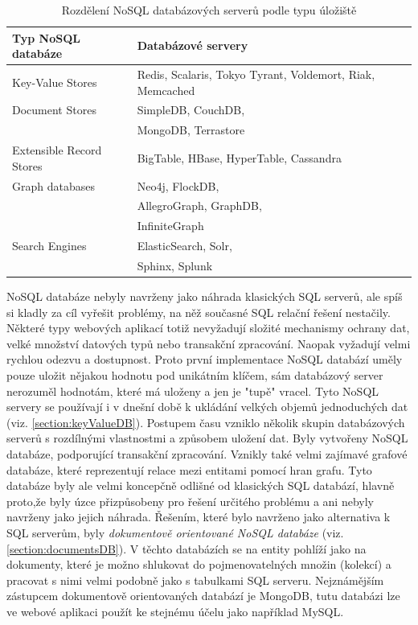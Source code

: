 \begin{table}[h]
\centering
	\caption{Rozdělení NoSQL databázových serverů podle typu úložiště \cite{cattellStores}}
	\begin{tabular}{ |p{5cm}|p{5cm}| }
	\hline
	Typ NoSQL databáze & Databázové servery \\ \hline
	Key-Value Stores & Redis, Scalaris, Tokyo Tyrant, Voldemort, Riak, Memcached \\ \hline
	Document Stores & SimpleDB, CouchDB, \\
	& MongoDB, Terrastore \\ \hline
	Extensible Record Stores & BigTable, HBase, HyperTable, Cassandra \\ \hline
	Graph databases & Neo4j, FlockDB, \\ & AllegroGraph, GraphDB, \\ & InfiniteGraph \\ \hline
	Search Engines & ElasticSearch, Solr,\\ & Sphinx, Splunk \\ \hline
	\end{tabular}

	\label{tab:rozdeleniNoSQLServeru}
\end{table}
NoSQL databáze nebyly navrženy jako náhrada klasických SQL serverů, ale spíš si kladly za cíl vyřešit problémy, na něž současné SQL relační řešení nestačily. Některé typy webových aplikací totiž nevyžadují složité mechanismy ochrany dat, velké množství datových typů nebo transakční zpracování. Naopak vyžadují velmi rychlou odezvu a dostupnost. Proto první implementace NoSQL databází uměly pouze uložit nějakou hodnotu pod unikátním klíčem, sám databázový server nerozuměl hodnotám, které má uloženy a jen je "tupě"  vracel. Tyto NoSQL servery se používají i v dnešní době k ukládání velkých objemů jednoduchých dat (viz. \ref{section:keyValueDB}). Postupem času vzniklo několik skupin databázových serverů s rozdílnými vlastnostmi a způsobem uložení dat. Byly vytvořeny NoSQL databáze, podporující transakční zpracování. Vznikly také velmi zajímavé grafové databáze, které reprezentují relace mezi entitami pomocí hran grafu. Tyto databáze byly ale velmi koncepčně odlišné od klasických SQL databází, hlavně proto,že byly úzce přizpůsobeny pro řešení určitého problému a ani nebyly navrženy jako jejich náhrada. Řešením, které bylo navrženo jako alternativa k SQL serverům, byly \emph{dokumentově orientované NoSQL databáze} (viz. \ref{section:documentsDB}).
V těchto databázích se na entity pohlíží jako na dokumenty, které je možno shlukovat do pojmenovatelných množin (kolekcí) a pracovat s nimi velmi podobně jako s tabulkami SQL serveru.
Nejznámějším zástupcem dokumentově orientovaných databází je MongoDB, tutu databázi lze ve webové aplikaci použít ke stejnému účelu jako například MySQL.
